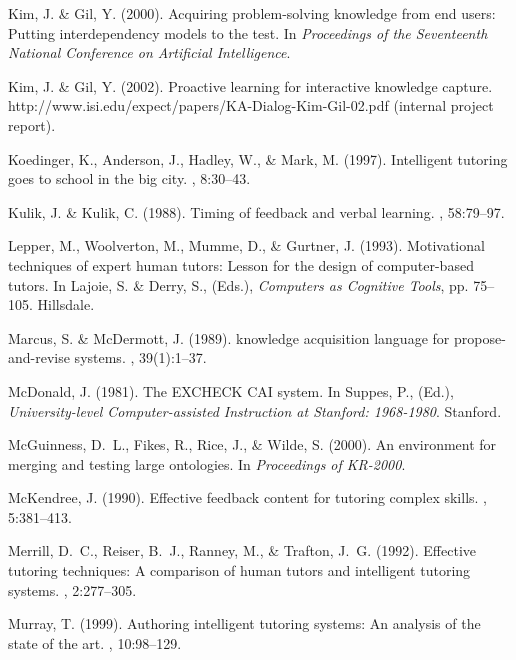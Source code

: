 \documentclass{llncs}
\begin{document}
\begin{thebibliography}{}
Kim, J. \& Gil, Y. (2000).
\newblock Acquiring problem-solving knowledge from end users: Putting
  interdependency models to the test.
\newblock In {\em Proceedings of the Seventeenth National Conference on
  Artificial Intelligence}.

Kim, J. \& Gil, Y. (2002).
\newblock Proactive learning for interactive knowledge capture.
\newblock http://www.isi.edu/expect/papers/KA-Dialog-Kim-Gil-02.pdf
(internal project report).

Koedinger, K., Anderson, J., Hadley, W., \& Mark, M. (1997).
\newblock Intelligent tutoring goes to school in the big city.
,
  8:30--43.

Kulik, J. \& Kulik, C. (1988).
\newblock Timing of feedback and verbal learning.
, 58:79--97.

Lepper, M., Woolverton, M., Mumme, D., \& Gurtner, J. (1993).
\newblock Motivational techniques of expert human tutors: Lesson for the design
  of computer-based tutors.
\newblock In Lajoie, S. \& Derry, S., {\rm (Eds.)}, {\em Computers as Cognitive
  Tools}, pp. 75--105. Hillsdale.

Marcus, S. \& McDermott, J. (1989).
 knowledge acquisition language for propose-and-revise
  systems.
, 39(1):1--37.

McDonald, J. (1981).
\newblock The EXCHECK CAI system.
\newblock In Suppes, P., {\rm (Ed.)}, {\em University-level Computer-assisted
  Instruction at Stanford: 1968-1980}. Stanford.

McGuinness, D.~L., Fikes, R., Rice, J., \& Wilde, S. (2000).
\newblock An environment for merging and testing large ontologies.
\newblock In {\em Proceedings of KR-2000}.

McKendree, J. (1990).
\newblock Effective feedback content for tutoring complex skills.
, 5:381--413.

Merrill, D.~C., Reiser, B.~J., Ranney, M., \& Trafton, J.~G. (1992).
\newblock Effective tutoring techniques: A comparison of human tutors and
  intelligent tutoring systems.
, 2:277--305.

Murray, T. (1999).
\newblock Authoring intelligent tutoring systems: {A}n analysis of the state of
  the art.
,
  10:98--129.


\end{thebibliography}
\end{document}
